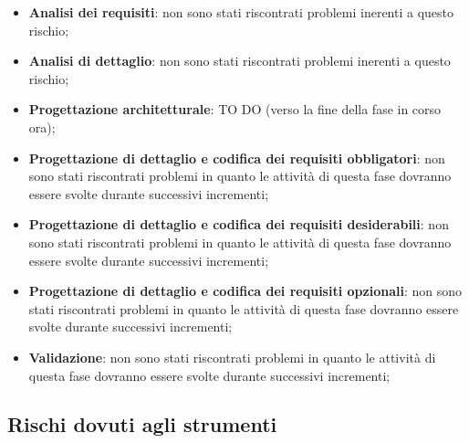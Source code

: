 			\begin{itemize}
				\item \textbf{Analisi dei requisiti}: non sono stati riscontrati problemi inerenti a questo rischio;
				\item \textbf{Analisi di dettaglio}: non sono stati riscontrati problemi inerenti a questo rischio;
				\item \textbf{Progettazione architetturale}: TO DO (verso la fine della fase in corso ora);
				\item \textbf{Progettazione di dettaglio e codifica dei requisiti obbligatori}: non sono stati riscontrati problemi in quanto le attività di questa fase dovranno essere svolte durante successivi incrementi;
				\item \textbf{Progettazione di dettaglio e codifica dei requisiti desiderabili}: non sono stati riscontrati problemi in quanto le attività di questa fase dovranno essere svolte durante successivi incrementi;
				\item \textbf{Progettazione di dettaglio e codifica dei requisiti opzionali}: non sono stati riscontrati problemi in quanto le attività di questa fase dovranno essere svolte durante successivi incrementi;
				\item \textbf{Validazione}: non sono stati riscontrati problemi in quanto le attività di questa fase dovranno essere svolte durante successivi incrementi;
			\end{itemize}



	\subsection{Rischi dovuti agli strumenti} %
	\label{sub:rischi_dovuti_agli_strumenti}
